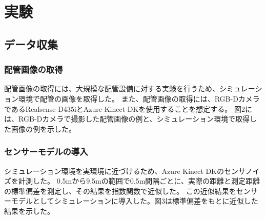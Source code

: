 \chapter{実験}

\section{データ収集}

\subsection{配管画像の取得}
配管画像の取得には、大規模な配管設備に対する実験を行うため、シミュレーション環境で配管の画像を取得した。
また、配管画像の取得には、RGB-DカメラであるRealsense D435iとAzure Kinect DKを使用することを想定する。
図2には、RGB-Dカメラで撮影した配管画像の例と、シミュレーション環境で取得した画像の例を示した。

\subsection{センサーモデルの導入}
シミュレーション環境を実環境に近づけるため、Azure Kinect DKのセンサノイズを計測した。
0.5mから9.5mの範囲で0.5m間隔ごとに、実際の距離と測定距離の標準偏差を測定し、その結果を指数関数で近似した。
この近似結果をセンサーモデルとしてシミュレーションに導入した。図3は標準偏差をもとに近似した結果を示した。




